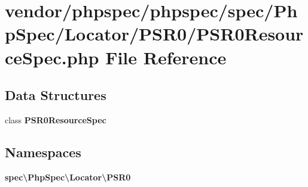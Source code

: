 \section{vendor/phpspec/phpspec/spec/\+Php\+Spec/\+Locator/\+P\+S\+R0/\+P\+S\+R0\+Resource\+Spec.php File Reference}
\label{_p_s_r0_resource_spec_8php}
\subsection*{Data Structures}
\begin{DoxyCompactItemize}
\item 
class {\bf P\+S\+R0\+Resource\+Spec}
\end{DoxyCompactItemize}
\subsection*{Namespaces}
\begin{DoxyCompactItemize}
\item 
 {\bf spec\textbackslash{}\+Php\+Spec\textbackslash{}\+Locator\textbackslash{}\+P\+S\+R0}
\end{DoxyCompactItemize}
